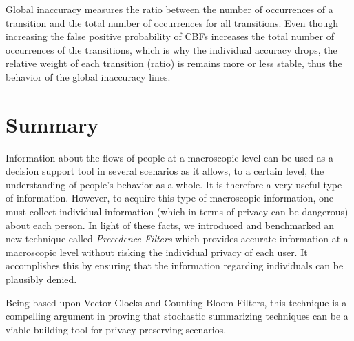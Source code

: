 Global inaccuracy measures the ratio between the number of occurrences
of a transition and the total number of occurrences for all transitions.
Even though increasing the false positive probability of CBFs
increases the total number of occurrences of the transitions, which is
why the individual accuracy drops, the relative weight of each
transition (ratio) is remains more or less stable, thus the behavior of the
global inaccuracy lines.

\section{Summary}
\label{sec:ct-summary}

Information about the flows of people at a macroscopic level can be used as
a decision support tool in several scenarios as it allows, to a
certain level, the understanding of people's behavior as a whole.  It
is therefore a very useful type of information.  However, to acquire
this type of macroscopic  information, one must collect individual
information (which in terms of privacy can be dangerous) about each
person. In light of these facts, we introduced and benchmarked an new
technique called \emph{Precedence Filters} which provides accurate
information at a macroscopic level without risking the individual
privacy of each user. It accomplishes this by ensuring that the
information regarding individuals can be plausibly denied.

Being based upon Vector Clocks and Counting Bloom Filters, this
technique is a compelling argument in proving that stochastic
summarizing techniques can be a viable building tool for privacy
preserving scenarios.


